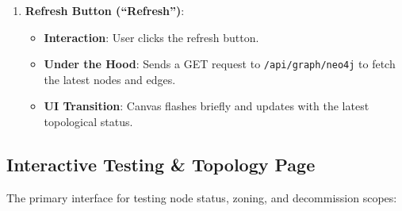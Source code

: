 \documentclass[11pt,a4paper]{article}
\begin{document}
\begin{enumerate}
    \item \textbf{Refresh Button (``Refresh'')}:
    \begin{itemize}
        \item \textbf{Interaction}: User clicks the refresh button.
        \item \textbf{Under the Hood}: Sends a GET request to \texttt{/api/graph/neo4j} to fetch the latest nodes and edges.
        \item \textbf{UI Transition}: Canvas flashes briefly and updates with the latest topological status.
    \end{itemize}
\end{enumerate}

\subsection{Interactive Testing \& Topology Page}
The primary interface for testing node status, zoning, and decommission scopes:
\end{document}
